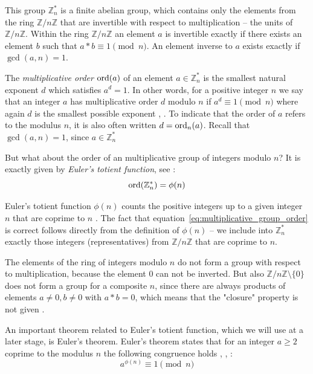 This group $\mathbb{Z}_n^\ast$ is a finite abelian group, which contains only the elements from the ring $\mathbb{Z}/n\mathbb{Z}$ that are invertible with respect to multiplication -- the units of $\mathbb{Z}/n\mathbb{Z}$. Within the ring $\mathbb{Z}/n\mathbb{Z}$ an element $a$ is invertible exactly if there exists an element $b$ such that $a*b\equiv1\pmod n$. An element inverse to $a$ exists exactly if $\gcd(a,n)=1$.

The \textit{multiplicative order} $\operatorname{ord}(a)$ of an element $a\in\mathbb{Z}_n^\ast$ is the smallest natural exponent $d$ which satisfies $a^d=1$. In other words, for a positive integer $n$ we say that an integer $a$ has multiplicative order $d$ modulo $n$ if $a^d\equiv1\pmod n$ where again $d$ is the smallest possible exponent \cite[p.~76]{Ref_Hutz_2018}, \cite[p.~32]{Ref_Shoup_2008}. To indicate that the order of $a$ refers to the modulus $n$, it is also often written $d=\operatorname{ord}_n(a)$. Recall that $\gcd(a,n)=1$, since $a\in\mathbb{Z}_n^\ast$

But what about the order of an multiplicative group of integers modulo $n$? It is exactly given by \textit{Euler's totient function}, see \cite[p.~27]{Ref_Wolfart_2011}:
\begin{equation}
\label{eq:multiplicative_group_order}
\operatorname{ord}(\mathbb{Z}_n^\ast)=\phi(n)
\end{equation}

Euler's totient function $\phi(n)$ counts the positive integers up to a given integer $n$ that are coprime to $n$ \cite[p.~49]{Ref_Forster_2015}. The fact that equation~\ref{eq:multiplicative_group_order} is correct follows directly from the definition of $\phi(n)$ -- we include into $\mathbb{Z}_n^\ast$ exactly those integers (representatives) from $\mathbb{Z}/n\mathbb{Z}$ that are coprime to $n$.

\begin{remark}
The elements of the ring of integers modulo $n$ do not form a group with respect to multiplication, because the element $0$ can not be inverted. But also $\mathbb{Z}/n\mathbb{Z}\setminus\{0\}$ does not form a group for a composite $n$, since there are always products of elements $a\ne0,b\ne0$ with $a*b=0$, which means that the "closure" property is not given \cite{Ref_Schwalen_2014}.
\end{remark}

An important theorem related to Euler's totient function, which we will use at a later stage, is Euler's theorem. Euler's theorem states that for an integer $a\ge2$ coprime to the modulus $n$ the following congruence holds \cite[p.~37]{Ref_Mueller-Stach_2011}, \cite[p.~56]{Ref_Forster_2015}, \cite[p.~104]{Ref_Teschl_2013}:
\begin{equation}
\label{eq:eulers_theorem}
a^{\phi(n)}\equiv1\pmod n
\end{equation}

